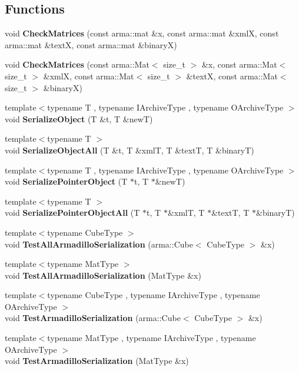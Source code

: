 \subsection*{Functions}
\begin{DoxyCompactItemize}
\item 
void {\bf Check\+Matrices} (const arma\+::mat \&x, const arma\+::mat \&xmlX, const arma\+::mat \&textX, const arma\+::mat \&binaryX)
\item 
void {\bf Check\+Matrices} (const arma\+::\+Mat$<$ size\+\_\+t $>$ \&x, const arma\+::\+Mat$<$ size\+\_\+t $>$ \&xmlX, const arma\+::\+Mat$<$ size\+\_\+t $>$ \&textX, const arma\+::\+Mat$<$ size\+\_\+t $>$ \&binaryX)
\item 
{\footnotesize template$<$typename T , typename I\+Archive\+Type , typename O\+Archive\+Type $>$ }\\void {\bf Serialize\+Object} (T \&t, T \&newT)
\item 
{\footnotesize template$<$typename T $>$ }\\void {\bf Serialize\+Object\+All} (T \&t, T \&xmlT, T \&textT, T \&binaryT)
\item 
{\footnotesize template$<$typename T , typename I\+Archive\+Type , typename O\+Archive\+Type $>$ }\\void {\bf Serialize\+Pointer\+Object} (T $\ast$t, T $\ast$\&newT)
\item 
{\footnotesize template$<$typename T $>$ }\\void {\bf Serialize\+Pointer\+Object\+All} (T $\ast$t, T $\ast$\&xmlT, T $\ast$\&textT, T $\ast$\&binaryT)
\item 
{\footnotesize template$<$typename Cube\+Type $>$ }\\void {\bf Test\+All\+Armadillo\+Serialization} (arma\+::\+Cube$<$ Cube\+Type $>$ \&x)
\item 
{\footnotesize template$<$typename Mat\+Type $>$ }\\void {\bf Test\+All\+Armadillo\+Serialization} (Mat\+Type \&x)
\item 
{\footnotesize template$<$typename Cube\+Type , typename I\+Archive\+Type , typename O\+Archive\+Type $>$ }\\void {\bf Test\+Armadillo\+Serialization} (arma\+::\+Cube$<$ Cube\+Type $>$ \&x)
\item 
{\footnotesize template$<$typename Mat\+Type , typename I\+Archive\+Type , typename O\+Archive\+Type $>$ }\\void {\bf Test\+Armadillo\+Serialization} (Mat\+Type \&x)
\end{DoxyCompactItemize}


